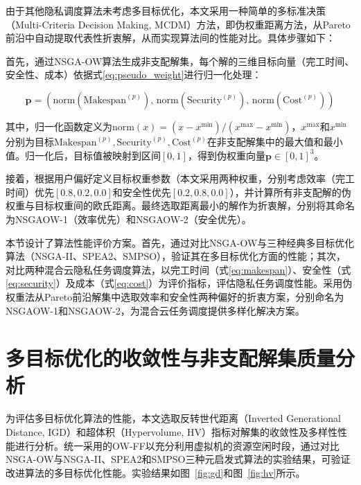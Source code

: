 由于其他隐私调度算法未考虑多目标优化，本文采用一种简单的多标准决策（Multi-Criteria Decision Making, MCDM）方法，即伪权重距离方法\cite{sureshMachineLearningBasedPrediction2024}，从Pareto前沿中自动提取代表性折衷解，从而实现算法间的性能对比。具体步骤如下：

首先，通过NSGA-OW算法生成非支配解集，每个解的三维目标向量（完工时间、安全性、成本）依据式\eqref{eq:pseudo_weight}进行归一化处理：

\begin{equation}
    \mathbf{p} = \left( \mathrm{norm}\!\left(\text{Makespan}^{(p)}\right), \, \mathrm{norm}\!\left(\text{Security}^{(p)}\right), \, \mathrm{norm}\!\left(\text{Cost}^{(p)}\right) \right)
    \label{eq:pseudo_weight}
\end{equation}

其中，归一化函数定义为\(\text{norm}(x) = (x - x^{\min}) / (x^{\max} - x^{\min})\)，\(x^{\max}\)和\(x^{\min}\)分别为目标\(\text{Makespan}^{(p)}, \text{Security}^{(p)}, \text{Cost}^{(p)}\)在非支配解集中的最大值和最小值。归一化后，目标值被映射到区间\([0,1]\)，得到伪权重向量\(\mathbf{p} \in [0,1]^3\)。

接着，根据用户偏好定义目标权重参数（本文采用两种权重，分别考虑效率（完工时间）优先\([0.8, 0.2, 0.0]\)和安全性优先\([0.2, 0.8, 0.0]\)），并计算所有非支配解的伪权重与目标权重间的欧氏距离。最终选取距离最小的解作为折衷解，分别将其命名为NSGAOW-1（效率优先）和NSGAOW-2（安全优先）。

本节设计了算法性能评价方案。首先，通过对比NSGA-OW与三种经典多目标优化算法（NSGA-II、SPEA2、SMPSO），验证其在多目标优化方面的性能；其次，对比两种混合云隐私任务调度算法，以完工时间（式\eqref{eq:makespan}）、安全性（式\eqref{eq:security}）及成本（式\eqref{eq:cost}）为评价指标，评估隐私任务调度性能。采用伪权重法从Pareto前沿解集中选取效率和安全性两种偏好的折衷方案，分别命名为NSGAOW-1和NSGAOW-2，为混合云任务调度提供多样化解决方案。

\section{多目标优化的收敛性与非支配解集质量分析}

为评估多目标优化算法的性能，本文选取反转世代距离（Inverted Generational Distance, IGD）和超体积（Hypervolume, HV）指标对解集的收敛性及多样性性能进行分析。统一采用的OW-FF以充分利用虚拟机的资源空闲时段，通过对比NSGA-OW与NSGA-II、SPEA2和SMPSO三种元启发式算法的实验结果，可验证改进算法的多目标优化性能。实验结果如图~\ref{fig:gd}和图~\ref{fig:hv}所示。

